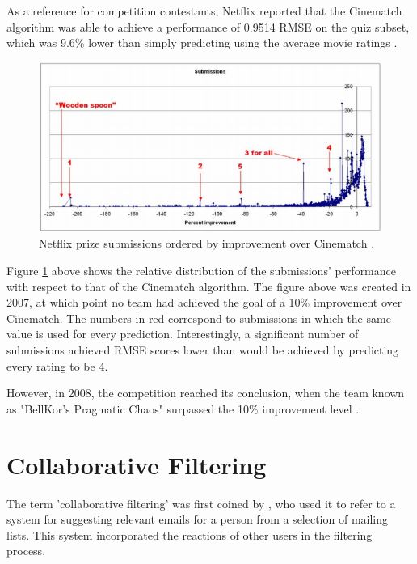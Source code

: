 As a reference for competition contestants, Netflix reported that the Cinematch algorithm was able to achieve a performance of 0.9514 RMSE on the quiz subset, which was 9.6\% lower than simply predicting using the average movie ratings \parencite{netflix_description}.

\begin{figure}[H]
\centering
\includegraphics[width=13cm]{Figures/2_1_netflix-prize.png}
\decoRule
\caption[Netflix submissions]{Netflix prize submissions ordered by improvement over Cinematch \parencite{netflix_description}.}
\label{fig:netflix_submissions}
\end{figure}

Figure \ref{fig:netflix_submissions} above shows the relative distribution of the submissions' performance with respect to that of the Cinematch algorithm. The figure above was created in 2007, at which point no team had achieved the goal of a 10\% improvement over Cinematch. The numbers in red correspond to submissions in which the same value is used for every prediction. Interestingly, a significant number of submissions achieved RMSE scores lower than would be achieved by predicting every rating to be 4.

However, in 2008, the competition reached its conclusion, when the team known as "BellKor's Pragmatic Chaos" surpassed the 10\% improvement level \parencite{netflix_bellkor}.

\section{Collaborative Filtering}
The term 'collaborative filtering' was first coined by \cite{cf_1.3_origin}, who used it to refer to a system for suggesting relevant emails for a person from a selection of mailing lists. This system incorporated the reactions of other users in the filtering process.

